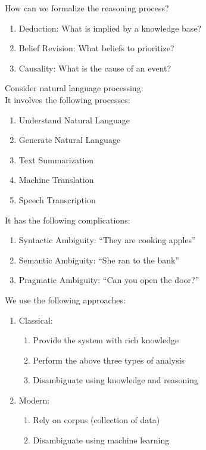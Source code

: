 \documentclass[../../lecture_notes.tex]{subfiles}
\begin{document}
How can we formalize the reasoning process?
\begin{enumerate} [itemsep=0mm]
	\item Deduction: What is implied by a knowledge base?
	\item Belief Revision: What beliefs to prioritize?
	\item Causality: What is the cause of an event?
\end{enumerate} \medskip

\noindent Consider natural language processing:\\
	\indent It involves the following processes:
		\begin{enumerate} [itemsep=0mm]
			\item Understand Natural Language
			\item Generate Natural Language
			\item Text Summarization
			\item Machine Translation
			\item Speech Transcription
		\end{enumerate}
	It has the following complications:
	\begin{enumerate} [itemsep=0mm]
		\item Syntactic Ambiguity: “They are cooking apples”
		\item Semantic Ambiguity: “She ran to the bank”
		\item Pragmatic Ambiguity: “Can you open the door?”
	\end{enumerate}
\noindent We use the following approaches:
\begin{enumerate} [itemsep=0mm]
	\item Classical: 
		\begin{enumerate} [itemsep=0mm]
			\item Provide the system with rich knowledge
			\item Perform the above three types of analysis
			\item Disambiguate using knowledge and reasoning
		\end{enumerate}
	\item Modern:
		\begin{enumerate} [itemsep=0mm]
			\item Rely on corpus (collection of data)
			\item Disambiguate using machine learning
		\end{enumerate}
\end{enumerate} \medskip
\end{document}
